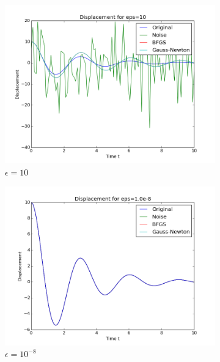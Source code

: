 \documentclass{article}
\begin{document}
\begin{figure}
    \centering
    \begin{subfigure}[b]{0.45\textwidth}
        \includegraphics[width=\textwidth]{noise0}
        \caption{$\epsilon=10$}
        \label{fig:gull}
    \end{subfigure}
    \begin{subfigure}[b]{0.45\textwidth}
        \includegraphics[width=\textwidth]{noise8}
        \caption{$\epsilon=10^{-8}$}
        \label{fig:tiger}
    \end{subfigure}
    \begin{subfigure}[b]{0.45\textwidth}

\end{subfigure}
\end{figure}
\end{document}
